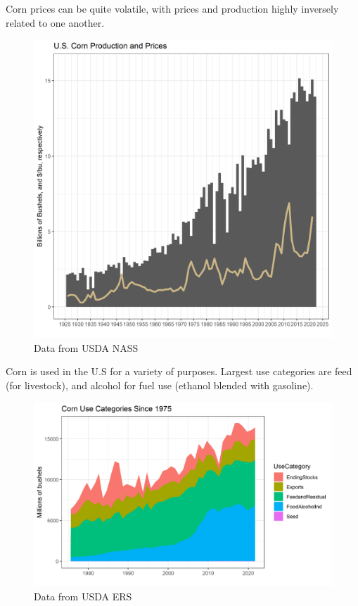 \documentclass[
  letterpaper,
  DIV=11,
  numbers=noendperiod]{scrreprt}
\begin{document}
Corn prices can be quite volatile, with prices and production highly
inversely related to one another.

\begin{figure}[H]

{\centering \includegraphics{assets/PrimerforGrain_CornProdand$.png}

}

\caption{Data from USDA NASS}

\end{figure}%

Corn is used in the U.S for a variety of purposes. Largest use
categories are feed (for livestock), and alcohol for fuel use (ethanol
blended with gasoline).

\begin{figure}[H]

{\centering \includegraphics{assets/PrimerforGrain_CornUse.png}

}

\caption{Data from USDA ERS}

\end{figure}%
\end{document}
